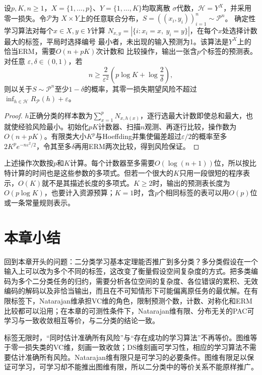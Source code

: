 \begin{theorem}[有限输入上的多分类表学习]
\label{thm:multiclass-table-erm}
设$p,K,n\geq1$，$X=\{1,\ldots,p\}$、$Y=\{1,\ldots,K\}$均取离散
$\sigma$代数，$\mathcal H=Y^X$，并采用零一损失。令$\mathcal P$为
$X\times Y$上的任意联合分布，$S=((x_i,y_i))_{i=1}^n\sim\mathcal P^n$。
确定性学习算法对每个$x\in X,y\in Y$计算
$N_{x,y}=|\{i:x_i=x,\ y_i=y\}|$，在每个$x$处选择计数最大的标签，平局时选择编号
最小者，未出现的输入预测为1。该算法是$Y^X$上的恰当ERM，需要$O(n+pK)$次计数和
比较操作，输出一张含$p$个标签的预测表。对任意
$\varepsilon,\delta\in(0,1)$，若
\[
 n\geq\frac{2}{\varepsilon^2}
       \left(p\log K+\log\frac2\delta\right),
\]
则以关于$S\sim\mathcal P^n$至少$1-\delta$的概率，其零一损失期望风险不超过
$\inf_{h\in\mathcal H}R_{\mathcal P}(h)+\varepsilon$。
\end{theorem}

\begin{proof}
$h$正确分类的样本数为$\sum_{x=1}^pN_{x,h(x)}$，逐行选最大计数即使总和最大，也就使经验风险最小。初始化$pK$计数器、扫描$n$观测、再逐行比较，操作数为$O(n+pK)$。有限类大小$K^p$与Hoeffding并集使偏差超过$\varepsilon/2$的概率至多$2K^pe^{-n\varepsilon^2/2}$，令其至多$\delta$再用ERM两次比较，得到风险保证。
\end{proof}

上述操作次数按$p$和$K$计算。每个计数器至多需要$O(\log(n+1))$位，所以按比特计算的时间也是这些参数的多项式。但若一个很大的$K$只用一段很短的程序表示，$O(K)$就不是其描述长度的多项式。$K\geq2$时，输出的预测表长度为$O(p\log K)$，也要计入资源预算；$K=1$时，含$p$个相同标签的表可以用$O(p)$位或一条常量规则表示。

\section{本章小结}
\label{sec:multiclass-learning-summary}

回到本章开头的问题：二分类学习基本定理能否推广到多分类？多分类假设在一个输入上可以改为多个不同的标签，这改变了衡量假设空间复杂度的方式。把多类编码为多个二分类任务的归约，需要分析各位空间的复杂度、各位错误的累积、无效编码的解码以及非恰当输出，而且在不可知情形下可能偏离原任务的最优解。在有限标签下，Natarajan维承担VC维的角色，限制预测个数，计数、对称化和ERM比较都可以沿用；在本章的可测性条件下，Natarajan维有限、分布无关的PAC可学习与一致收敛相互等价，与二分类的结论一致。

标签无限时，“同时估计准确所有风险”与“存在成功的学习算法”不再等价。图维等于零一损失类的VC维，刻画一致收敛；DS维刻画可学习性，相应的学习算法不需要估计准确所有风险。Natarajan维有限只是可学习的必要条件。图维有限足以保证可学习，可学习却不能推出图维有限，所以二分类中的等价关系不能原样推广。

